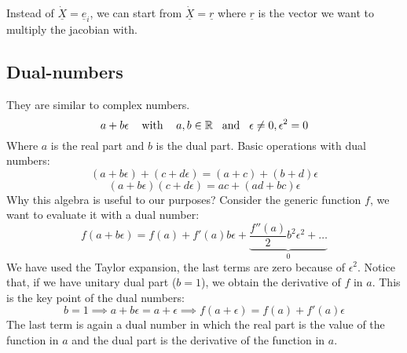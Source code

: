 Instead of $\underline{\dot{X}} = \underline{e}_i$, we can start from $\underline{\dot{X}} = \underline{r}$ where $\underline{r}$ is the vector we want to multiply the jacobian with. 

\subsection{Dual-numbers}
They are similar to complex numbers. 
\[
    a + b\epsilon \hspace{0.3cm} \text{ with }\hspace{0.3cm} a,b \in \mathbb{R} \hspace{0.3cm} \text{and} \hspace{0.3cm} \epsilon \neq 0, \epsilon^2 = 0    
\]
Where $a$ is the real part and $b$ is the dual part. Basic operations with dual numbers:
\[
    (a + b\epsilon) + (c + d\epsilon) = (a + c) + (b + d)\epsilon    
\]
\[
    (a + b\epsilon)(c + d\epsilon) = ac + (ad + bc)\epsilon     
\]
Why this algebra is useful to our purposes? Consider the generic function $f$, we want to evaluate it with a dual number:
\[
    f(a + b\epsilon) = f(a) + f'(a)b\epsilon + \underbrace{\dfrac{f''(a)}{2}b^2\epsilon^2   + \dots}_{0}
\]
We have used the Taylor expansion, the last terms are zero because of $\epsilon^2$. Notice that, if we have unitary dual part ($b = 1$), we obtain the derivative of $f$ in $a$. This is the key point of the dual numbers:
\[
    b=1 \implies a + b\epsilon = a + \epsilon \implies f(a + \epsilon) = f(a) + f'(a)\epsilon    
\]
The last term is again a dual number in which the real part is the value of the function in $a$ and the dual part is the derivative of the function in $a$.\\

